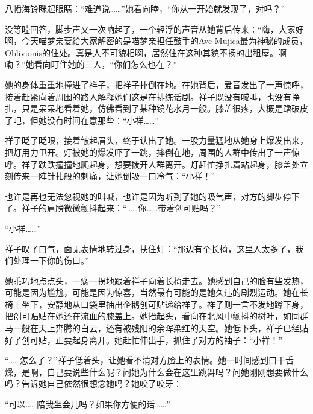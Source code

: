 \documentclass{article}
\begin{document}
八幡海铃眯起眼睛：“难道说……”她看向睦，“你从一开始就发现了，对吗？”



没等睦回答，脚步声又一次响起了，一个轻浮的声音从她背后传来：“嗨，大家好啊，今天喵梦亲要给大家解密的是喵梦亲担任鼓手的Ave Mujica最为神秘的成员，Oblivionis的住处。真是人不可貌相啊，居然住在这种其貌不扬的出租屋。啊嘞？”她看向盯住她的三人，“你们怎么也在？”



\newpage



她的身体重重地撞进了祥子，把祥子扑倒在地。在她背后，爱音发出了一声惊呼，接着赶紧向着周围的路人解释她们这是在排练话剧。祥子既没有喊叫，也没有挣扎，只是呆呆地看着她，仿佛看到了某种镜花水月一般。膝盖很疼，大概是蹭破皮了吧，但她没有时间在意那些：“小祥……”



祥子眨了眨眼，接着皱起眉头，终于认出了她。一股力量猛地从她身上爆发出来，把灯用力甩开。灯被她的爆发吓了一跳，摔倒在地，周围的人群中传出了一声惊呼。祥子跌跌撞撞地爬起身，想要拨开人群离开。灯赶忙挣扎着站起身，膝盖处立刻传来一阵针扎般的刺痛，让她倒吸一口冷气：“小祥！”



也许是再也无法忽视她的叫喊，也许是因为听到了她的吸气声，对方的脚步停下了。祥子的肩膀微微颤抖起来：“……你……带着创可贴吗？”



“小祥……”



祥子叹了口气，面无表情地转过身，扶住灯：“那边有个长椅，这里人太多了，我们处理一下你的伤口。”



她乖巧地点点头，一瘸一拐地跟着祥子向着长椅走去。她感到自己的脸有些发热，可能是因为尴尬，可能是因为惊喜，当然最有可能的是她久违的剧烈运动。她在长椅上坐下，安静地从口袋里抽出企鹅创可贴递给祥子。祥子则一言不发地蹲下身，把创可贴贴在她还在流血的膝盖上。她抬起头，看向在北风中颤抖的树叶，如同群马一般在天上奔腾的白云，还有被残阳的余晖染红的天空。她低下头，祥子已经贴好了创可贴，正要起身离开。她赶忙伸出手，抓住了对方的袖子：“小祥！”



“……怎么了？”祥子低着头，让她看不清对方脸上的表情。她一时间感到口干舌燥，是啊，自己要说些什么呢？问她为什么会在这里跳舞吗？问她刚刚想要做什么吗？告诉她自己依然很想念她吗？她咬了咬牙：



“可以……陪我坐会儿吗？如果你方便的话……”
\end{document}
